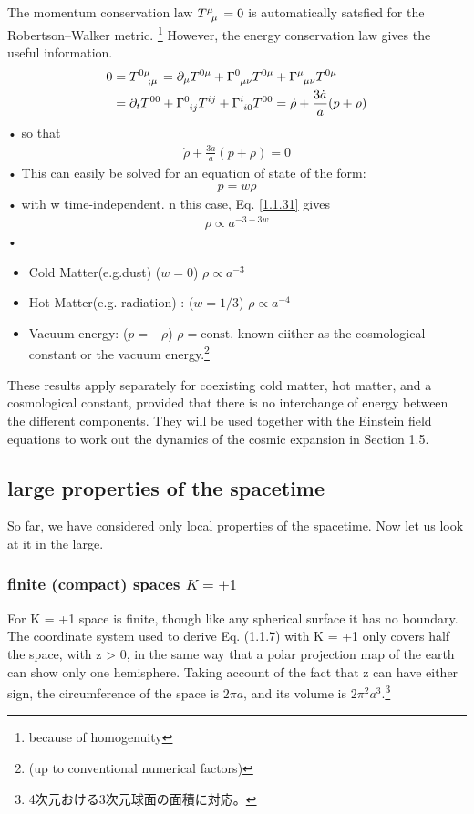 \documentclass[11pt,a4paper,dvipdfmx]{jsarticle}
\theoremstyle{plain}
\theoremstyle{break}
\begin{document}
The momentum conservation law $\tensor{T}{^{\mu}_{\mu}} = 0$ is automatically satsfied for the Robertson–Walker metric. \footnote{because of homogenuity}
However, the energy conservation law gives the useful information.
\begin{align}
0 &=\tensor{T}{^{0\mu}_{;\mu}}    = \partial_\mu \tensor{T}{^{0\mu}}
 								+ \tensor{\Gamma}{^0_{\mu \nu}}  \tensor{T}{^{0\mu}}
								+\tensor{\Gamma}{^\mu_{\mu \nu}} \tensor{T}{^{0\mu}}  \\
    &= \partial_t \tensor{T}{^{00}} + \tensor{\Gamma}{^0_{ij}} \tensor{T}{^{ij}}
						         + \tensor{\Gamma}{^i_{i0}}\tensor{T}{^{00}}
						         = \dot{\rho} + \frac{3\dot{a}}{a} (p + \rho)
\end{align}•%
so that
\begin{align}
	\dot{\rho} + \frac{3 \dot{a}}{a} (p + \rho) =0
\end{align}•%
This can easily be solved for an equation of state of the form:
\begin{align}
p = w \rho
\end{align}•%
with w time-independent.
n this case, Eq. \eqref{1.1.31} gives
\begin{align}
\rho \propto a^{-3 -3w}
\end{align}•%

\begin{itemize}
\item Cold Matter(e.g.dust) ($w=0$) $\rho \propto a^{-3}$
\item Hot Matter(e.g. radiation) : ($w=1/3$)  $\rho \propto a^{-4}$
\item Vacuum energy: ($p = -\rho$) $\rho = \mathrm{const.}$ known eiither as the cosmological constant or the vacuum energy.\footnote{(up to conventional numerical factors)}
\end{itemize}
These results apply separately for coexisting cold matter, hot matter, and a cosmological constant, provided that there is no interchange of energy between the different components. They will be used together with the Einstein field equations to work out the dynamics of the cosmic expansion in Section 1.5.

\subsection{large properties of the spacetime}
So far, we have considered only local properties of the spacetime. Now let us look at it in the large.

\subsubsection{finite (compact) spaces $K=+1$}
For K = +1 space is finite, though like any spherical surface it has no boundary. The coordinate system used to derive Eq. (1.1.7) with K = +1 only covers half the space, with z > 0, in the same way that a polar projection map of the earth can show only one hemisphere. Taking account of the fact that z can have either sign, the circumference of the space is $2\pi a$, and its volume is $2\pi^2 a^3$.\footnote{4次元おける3次元球面の面積に対応。}
\end{document}
